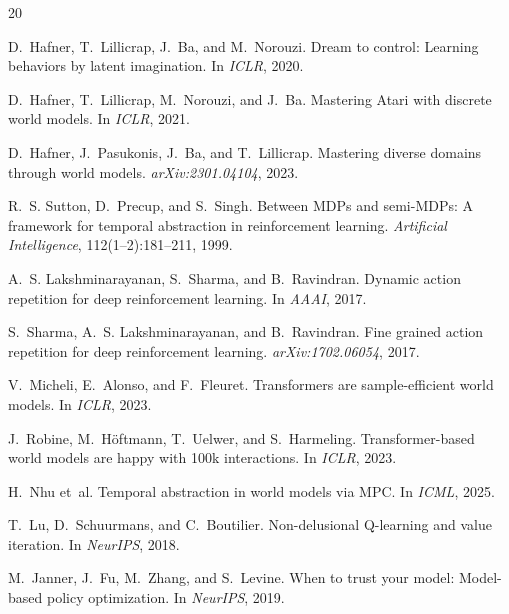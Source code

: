 \documentclass[10pt,letterpaper]{article}
\begin{document}
\begin{thebibliography}{20}

D.~Hafner, T.~Lillicrap, J.~Ba, and M.~Norouzi.
\newblock Dream to control: Learning behaviors by latent imagination.
\newblock In \emph{ICLR}, 2020.

D.~Hafner, T.~Lillicrap, M.~Norouzi, and J.~Ba.
\newblock Mastering Atari with discrete world models.
\newblock In \emph{ICLR}, 2021.

D.~Hafner, J.~Pasukonis, J.~Ba, and T.~Lillicrap.
\newblock Mastering diverse domains through world models.
\newblock \emph{arXiv:2301.04104}, 2023.

R.~S. Sutton, D.~Precup, and S.~Singh.
\newblock Between MDPs and semi-MDPs: A framework for temporal abstraction in reinforcement learning.
\newblock \emph{Artificial Intelligence}, 112(1--2):181--211, 1999.

A.~S. Lakshminarayanan, S.~Sharma, and B.~Ravindran.
\newblock Dynamic action repetition for deep reinforcement learning.
\newblock In \emph{AAAI}, 2017.

S.~Sharma, A.~S. Lakshminarayanan, and B.~Ravindran.
\newblock Fine grained action repetition for deep reinforcement learning.
\newblock \emph{arXiv:1702.06054}, 2017.

V.~Micheli, E.~Alonso, and F.~Fleuret.
\newblock Transformers are sample-efficient world models.
\newblock In \emph{ICLR}, 2023.

J.~Robine, M.~H{\"o}ftmann, T.~Uelwer, and S.~Harmeling.
\newblock Transformer-based world models are happy with 100k interactions.
\newblock In \emph{ICLR}, 2023.

H.~Nhu et~al.
\newblock Temporal abstraction in world models via MPC.
\newblock In \emph{ICML}, 2025.

T.~Lu, D.~Schuurmans, and C.~Boutilier.
\newblock Non-delusional Q-learning and value iteration.
\newblock In \emph{NeurIPS}, 2018.

M.~Janner, J.~Fu, M.~Zhang, and S.~Levine.
\newblock When to trust your model: Model-based policy optimization.
\newblock In \emph{NeurIPS}, 2019.


\end{thebibliography}
\end{document}
